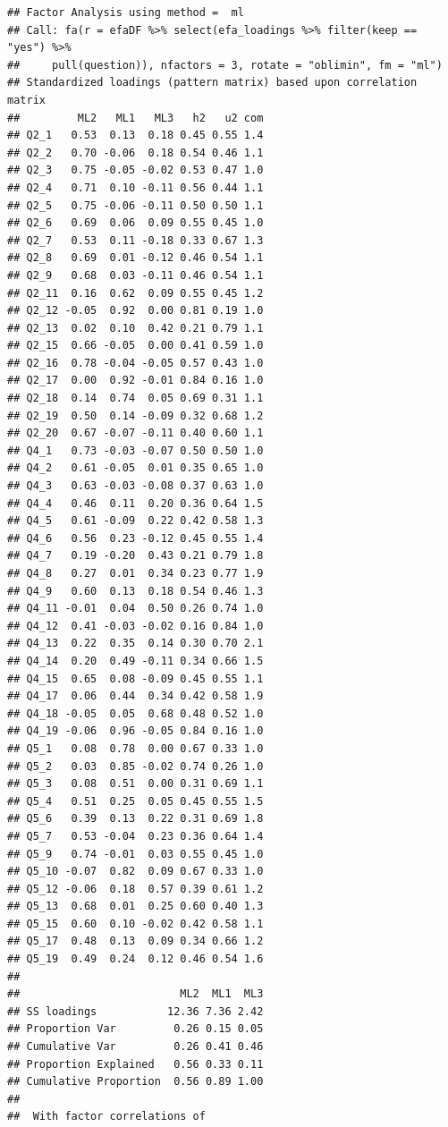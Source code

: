 \documentclass[
  man]{apa6}
\begin{document}
\begin{verbatim}
## Factor Analysis using method =  ml
## Call: fa(r = efaDF %>% select(efa_loadings %>% filter(keep == "yes") %>% 
##     pull(question)), nfactors = 3, rotate = "oblimin", fm = "ml")
## Standardized loadings (pattern matrix) based upon correlation matrix
##         ML2   ML1   ML3   h2   u2 com
## Q2_1   0.53  0.13  0.18 0.45 0.55 1.4
## Q2_2   0.70 -0.06  0.18 0.54 0.46 1.1
## Q2_3   0.75 -0.05 -0.02 0.53 0.47 1.0
## Q2_4   0.71  0.10 -0.11 0.56 0.44 1.1
## Q2_5   0.75 -0.06 -0.11 0.50 0.50 1.1
## Q2_6   0.69  0.06  0.09 0.55 0.45 1.0
## Q2_7   0.53  0.11 -0.18 0.33 0.67 1.3
## Q2_8   0.69  0.01 -0.12 0.46 0.54 1.1
## Q2_9   0.68  0.03 -0.11 0.46 0.54 1.1
## Q2_11  0.16  0.62  0.09 0.55 0.45 1.2
## Q2_12 -0.05  0.92  0.00 0.81 0.19 1.0
## Q2_13  0.02  0.10  0.42 0.21 0.79 1.1
## Q2_15  0.66 -0.05  0.00 0.41 0.59 1.0
## Q2_16  0.78 -0.04 -0.05 0.57 0.43 1.0
## Q2_17  0.00  0.92 -0.01 0.84 0.16 1.0
## Q2_18  0.14  0.74  0.05 0.69 0.31 1.1
## Q2_19  0.50  0.14 -0.09 0.32 0.68 1.2
## Q2_20  0.67 -0.07 -0.11 0.40 0.60 1.1
## Q4_1   0.73 -0.03 -0.07 0.50 0.50 1.0
## Q4_2   0.61 -0.05  0.01 0.35 0.65 1.0
## Q4_3   0.63 -0.03 -0.08 0.37 0.63 1.0
## Q4_4   0.46  0.11  0.20 0.36 0.64 1.5
## Q4_5   0.61 -0.09  0.22 0.42 0.58 1.3
## Q4_6   0.56  0.23 -0.12 0.45 0.55 1.4
## Q4_7   0.19 -0.20  0.43 0.21 0.79 1.8
## Q4_8   0.27  0.01  0.34 0.23 0.77 1.9
## Q4_9   0.60  0.13  0.18 0.54 0.46 1.3
## Q4_11 -0.01  0.04  0.50 0.26 0.74 1.0
## Q4_12  0.41 -0.03 -0.02 0.16 0.84 1.0
## Q4_13  0.22  0.35  0.14 0.30 0.70 2.1
## Q4_14  0.20  0.49 -0.11 0.34 0.66 1.5
## Q4_15  0.65  0.08 -0.09 0.45 0.55 1.1
## Q4_17  0.06  0.44  0.34 0.42 0.58 1.9
## Q4_18 -0.05  0.05  0.68 0.48 0.52 1.0
## Q4_19 -0.06  0.96 -0.05 0.84 0.16 1.0
## Q5_1   0.08  0.78  0.00 0.67 0.33 1.0
## Q5_2   0.03  0.85 -0.02 0.74 0.26 1.0
## Q5_3   0.08  0.51  0.00 0.31 0.69 1.1
## Q5_4   0.51  0.25  0.05 0.45 0.55 1.5
## Q5_6   0.39  0.13  0.22 0.31 0.69 1.8
## Q5_7   0.53 -0.04  0.23 0.36 0.64 1.4
## Q5_9   0.74 -0.01  0.03 0.55 0.45 1.0
## Q5_10 -0.07  0.82  0.09 0.67 0.33 1.0
## Q5_12 -0.06  0.18  0.57 0.39 0.61 1.2
## Q5_13  0.68  0.01  0.25 0.60 0.40 1.3
## Q5_15  0.60  0.10 -0.02 0.42 0.58 1.1
## Q5_17  0.48  0.13  0.09 0.34 0.66 1.2
## Q5_19  0.49  0.24  0.12 0.46 0.54 1.6
## 
##                         ML2  ML1  ML3
## SS loadings           12.36 7.36 2.42
## Proportion Var         0.26 0.15 0.05
## Cumulative Var         0.26 0.41 0.46
## Proportion Explained   0.56 0.33 0.11
## Cumulative Proportion  0.56 0.89 1.00
## 
##  With factor correlations of 

\end{verbatim}
\end{document}
